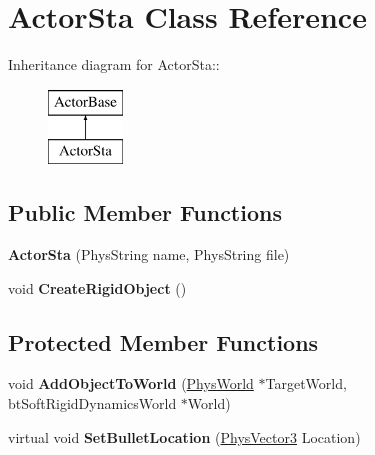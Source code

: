 \hypertarget{classActorSta}{
\section{ActorSta Class Reference}
\label{d3/daf/classActorSta}
}
Inheritance diagram for ActorSta::\begin{figure}[H]
\begin{center}
\leavevmode
\includegraphics[height=2cm]{d3/daf/classActorSta}
\end{center}
\end{figure}
\subsection*{Public Member Functions}
\begin{DoxyCompactItemize}
\item 
\hypertarget{classActorSta_a970ee3677eca8f69f6d25684d72c6c8c}{
{\bfseries ActorSta} (PhysString name, PhysString file)}
\label{d3/daf/classActorSta_a970ee3677eca8f69f6d25684d72c6c8c}

\item 
\hypertarget{classActorSta_ae856b69de748541606649d21d2e6c270}{
void {\bfseries CreateRigidObject} ()}
\label{d3/daf/classActorSta_ae856b69de748541606649d21d2e6c270}

\end{DoxyCompactItemize}
\subsection*{Protected Member Functions}
\begin{DoxyCompactItemize}
\item 
\hypertarget{classActorSta_acd11f1ee404ab71d49d8fd4a810f2931}{
void {\bfseries AddObjectToWorld} (\hyperlink{classPhysWorld}{PhysWorld} $\ast$TargetWorld, btSoftRigidDynamicsWorld $\ast$World)}
\label{d3/daf/classActorSta_acd11f1ee404ab71d49d8fd4a810f2931}

\item 
\hypertarget{classActorSta_a472768e39d3ac67f35b9f74e5a679b99}{
virtual void {\bfseries SetBulletLocation} (\hyperlink{classPhysVector3}{PhysVector3} Location)}
\label{d3/daf/classActorSta_a472768e39d3ac67f35b9f74e5a679b99}

\end{DoxyCompactItemize}
